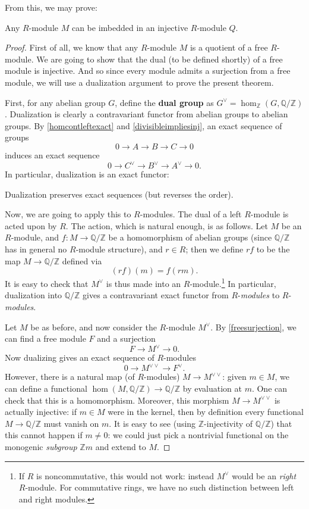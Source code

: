 From this, we may prove:
\begin{theorem}
Any $R$-module $M$ can be imbedded in an injective $R$-module $Q$.
\end{theorem}
\begin{proof} 
First of all, we know that any $R$-module $M$ is a quotient of a free
$R$-module.  We are going to show that the {dual} (to be defined shortly) of a free module is injective.  And so since
every module admits a surjection from a free module, we will use a  dualization
argument to prove the present theorem.

First, for any abelian group $G$, define the \textbf{dual group} as $G^\vee
= \hom_{\mathbb{Z}}(G, \mathbb{Q}/\mathbb{Z})$.
Dualization is clearly a contravariant functor from abelian groups to abelian
groups.
By \cref{homcontleftexact}
and \cref{divisibleimpliesinj}, an exact
sequence of groups
\[ 0 \to A \to B \to C \to 0 \]
induces an exact sequence
\[ 0 \to C^\vee \to B^\vee \to A^\vee \to 0 .\]
In particular, dualization is an exact functor:

\begin{proposition} Dualization preserves exact sequences (but reverses
the order).
\end{proposition}

Now, we are going to apply this to $R$-modules.  The dual of  a left $R$-module
is acted upon by $R$.
The action, which is natural enough, is as follows.  Let $M$ be an
$R$-module, and  $f: M \to
\mathbb{Q}/\mathbb{Z}$ be a homomorphism of abelian groups (since 
$\mathbb{Q}/\mathbb{Z}$ has in general no $R$-module structure), and $r \in
R$; then we define $rf$ to be the map $M \to \mathbb{Q}/\mathbb{Z}$ defined via
\[ (rf)(m) = f(rm).\]
It is easy to check that $M^{\vee}$ is thus made into an
$R$-module.\footnote{If $R$ is noncommutative, this would not work: instead
$M^{\vee}$ would be an \emph{right} $R$-module. For commutative rings, we have
no such distinction between left and right modules.}
In particular, dualization into $\mathbb{Q}/\mathbb{Z}$ gives a contravariant
exact functor from $R$-\emph{modules} to $R$-\emph{modules}.


  Let $M$ be as before,
and now consider the  $R$-module $M^{\vee}$.  By \cref{freesurjection}, we can
find a free
 module $F$ and a surjection
\[ F \to M^{\vee} \to 0.\]
Now dualizing gives an exact sequence of $R$-modules
\[ 0 \to M^{\vee \vee} \to F^{\vee}. \]
However, there is a natural map (of $R$-modules) $M \to M^{\vee \vee}$: given $m \in M$, we can
define a functional $\hom(M, \mathbb{Q}/\mathbb{Z}) \to \mathbb{Q}/\mathbb{Z}$
by evaluation at $m$. One can check that this is a homomorphism. Moreover, this morphism $M \to M^{\vee \vee}$ is actually injective: if $m \in M$ were
in the kernel, then by definition every functional $M \to
\mathbb{Q}/\mathbb{Z}$ must vanish on $m$. It is easy to see (using
$\mathbb{Z}$-injectivity of $\mathbb{Q}/\mathbb{Z}$) that this cannot happen
if $m \neq 0$: we could just pick a nontrivial functional on the monogenic
\emph{subgroup} $\mathbb{Z} m$ and extend to $M$.




\end{proof}

